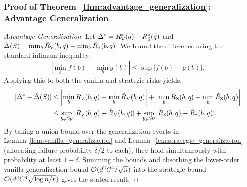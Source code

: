 \subsubsection*{Proof of Theorem~\ref{thm:advantage_generalization}: Advantage Generalization}
\label{app:proof_advantage_generalization}
\begin{proof}[Advantage Generalization]
Let $\Delta^* = R_{\mathrm{V}}^*(q) - R_{\mathrm{S}}^*(q)$ and $\hat{\Delta}(S) = \min_b \hat{R}_{\mathrm{V}}(b, q) - \min_b \hat{R}_{\mathrm{S}}(b, q)$. We bound the difference using the standard infimum inequality:
\begin{equation}
    \left| \min_{b} f(b) - \min_{b} g(b) \right| \le \sup_{b} |f(b) - g(b)|.
\end{equation}
Applying this to both the vanilla and strategic risks yields:
\begin{align}
    |\Delta^* - \hat{\Delta}(S)| &\le \left| \min_b R_{\mathrm{V}}(b, q) - \min_b \hat{R}_{\mathrm{V}}(b, q) \right| + \left| \min_b R_{\mathrm{S}}(b, q) - \min_b \hat{R}_{\mathrm{S}}(b, q) \right| \nonumber \\
    &\le \sup_{b \in \mathcal{W}} |R_{\mathrm{V}}(b, q) - \hat{R}_{\mathrm{V}}(b, q)| + \sup_{b \in \mathcal{W}} |R_{\mathrm{S}}(b, q) - \hat{R}_{\mathrm{S}}(b, q)|.
\end{align}
By taking a union bound over the generalization events in Lemma~\ref{lem:vanilla_generalization} and Lemma~\ref{lem:strategic_generalization} (allocating failure probability $\delta/2$ to each), they hold simultaneously with probability at least $1 - \delta$. Summing the bounds and absorbing the lower-order vanilla generalization bound $\mathcal{O}(d^2 C^4/\sqrt{n})$ into the strategic bound $\mathcal{O}(d^3 C^4 \sqrt{\log n / n})$ gives the stated result.
\end{proof}

